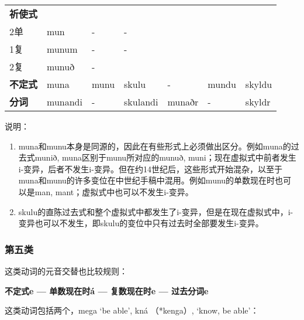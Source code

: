 \begin{longtable}{llll|lll}
    \textbf{祈使式} & ~                        & ~                        & \multicolumn{1}{c}{} & ~      & ~      & ~       \\
    2单             & mun                      & -                        & -                    & ~      & ~      & ~       \\
    1复             & munum                    & -                        & -                    & ~      & ~      & ~       \\
    2复             & munuð                    & -                        & \multicolumn{1}{c}{} & ~      & ~      & ~       \\
    \textbf{不定式} & muna                     & munu                     & skulu                & -      & mundu  & skyldu  \\
    \textbf{分词}   & munandi                  & -                        & skulandi             & munaðr & -      & skyldr  \\
\end{longtable}

说明：

\begin{enumerate}
    \item
          muna和munu本身是同源的，因此在有些形式上必须做出区分。例如muna的过去式munið,
          muna区别于munu所对应的munuð,
          muni；现在虚拟式中前者发生i-变异，后者不发生i-变异。但在约14世纪后，这些形式开始混杂，以至于muna和munu的许多变位在中世纪手稿中混用。例如munu的单数现在时也可以是man,
          mant；虚拟式中也可以不发生i-变异。
    \item
          skulu的直陈过去式和整个虚拟式中都发生了i-变异，但是在现在虚拟式中，i-变异也可以不发生，即skulu的变位中只有过去时全部要发生i-变异。
\end{enumerate}

\subsubsection{第五类}

这类动词的元音交替也比较规则：

\begin{center}
    \textbf{不定式e --- 单数现在时á --- 复数现在时e --- 过去分词e}
\end{center}

这类动词包括两个，mega `be able‌', kná （*kenga）, `know, be able‌'：

